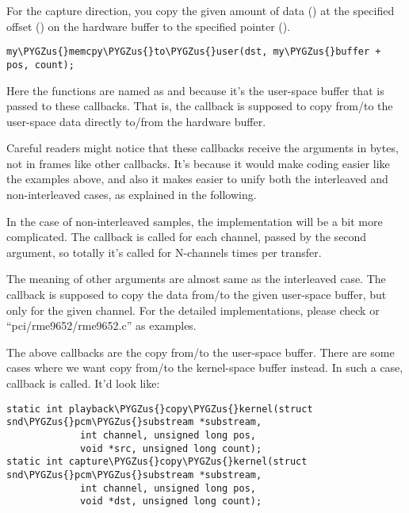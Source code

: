 \documentclass[a4paper,8pt,english]{sphinxmanual}
\def\PYGZus{\char`\_}
\begin{document}
For the capture direction, you copy the given amount of data ()
at the specified offset () on the hardware buffer to the
specified pointer ().

\begin{Verbatim}[commandchars=\\\{\}]
my\PYGZus{}memcpy\PYGZus{}to\PYGZus{}user(dst, my\PYGZus{}buffer + pos, count);
\end{Verbatim}

Here the functions are named as  and  because
it's the user-space buffer that is passed to these callbacks.  That
is, the callback is supposed to copy from/to the user-space data
directly to/from the hardware buffer.

Careful readers might notice that these callbacks receive the
arguments in bytes, not in frames like other callbacks.  It's because
it would make coding easier like the examples above, and also it makes
easier to unify both the interleaved and non-interleaved cases, as
explained in the following.

In the case of non-interleaved samples, the implementation will be a bit
more complicated.  The callback is called for each channel, passed by
the second argument, so totally it's called for N-channels times per
transfer.

The meaning of other arguments are almost same as the interleaved
case.  The callback is supposed to copy the data from/to the given
user-space buffer, but only for the given channel.  For the detailed
implementations, please check  or
``pci/rme9652/rme9652.c'' as examples.

The above callbacks are the copy from/to the user-space buffer.  There
are some cases where we want copy from/to the kernel-space buffer
instead.  In such a case,  callback is called.  It'd
look like:

\begin{Verbatim}[commandchars=\\\{\}]
static int playback\PYGZus{}copy\PYGZus{}kernel(struct snd\PYGZus{}pcm\PYGZus{}substream *substream,
             int channel, unsigned long pos,
             void *src, unsigned long count);
static int capture\PYGZus{}copy\PYGZus{}kernel(struct snd\PYGZus{}pcm\PYGZus{}substream *substream,
             int channel, unsigned long pos,
             void *dst, unsigned long count);
\end{Verbatim}
\end{document}
